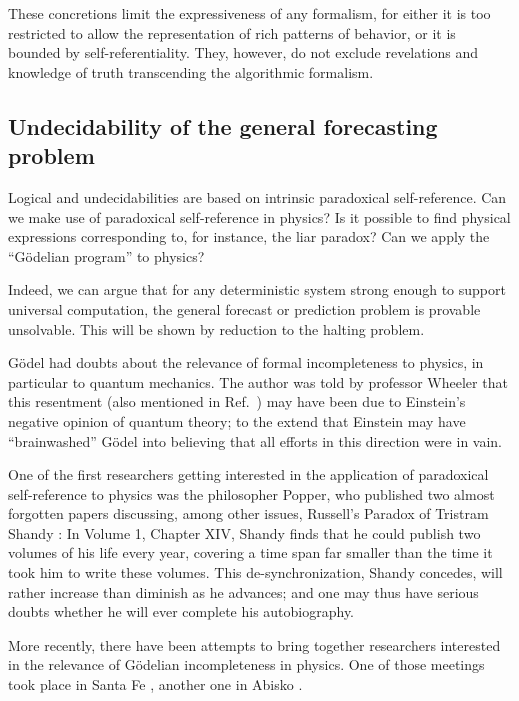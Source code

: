 \documentclass[rmp,amsfonts,showpacs,showkeys]{revtex4}
\begin{document}
These concretions limit the expressiveness of any formalism,
for either it is too restricted to allow the representation of rich patterns of behavior,
or it is bounded by self-referentiality.
They, however, do not exclude revelations
and knowledge of truth transcending the algorithmic formalism.



\subsection{Undecidability of the general forecasting problem}


Logical and undecidabilities are based on intrinsic paradoxical self-reference.
Can we make use of paradoxical self-reference in physics?
Is it possible to find physical expressions corresponding to,
for instance, the liar paradox?
Can we apply the ``G\"odelian program'' to physics?

Indeed, we can argue that for any deterministic system strong enough to support
universal computation,  the general forecast or prediction
problem is provable unsolvable.
This will be shown by reduction to the halting problem.

G\"odel had doubts about the relevance of formal incompleteness to physics,
in particular to quantum mechanics.
The author was told by professor Wheeler that this resentment
(also mentioned in Ref.~\cite[pp. 140-141]{bernstein})
may have been due to Einstein's negative opinion of quantum theory;
to the extend that Einstein may have ``brainwashed'' G\"odel
into believing that all efforts in this direction were in vain.

One of the first researchers getting interested in the application
of paradoxical self-reference to physics
was the philosopher Popper,
who published two almost forgotten papers
\cite{popper-50i,popper-50ii}
discussing, among other issues, Russell's Paradox of
Tristram Shandy \cite{sterne}:
In Volume 1, Chapter XIV, Shandy finds that he could publish
two volumes of his life every year,
covering a time span far smaller than the time it took him to write
these volumes. This de-synchronization, Shandy concedes,
will rather increase than diminish as he advances; and one may thus have serious doubts
whether he will ever complete his autobiography.

More recently, there have been attempts to bring together researchers
interested in the relevance of G\"odelian incompleteness in physics.
One of those meetings took place in Santa Fe
\cite{casti:94-onlimits_book}, another one in Abisko
\cite{casti:96-onlimits}.
\end{document}

